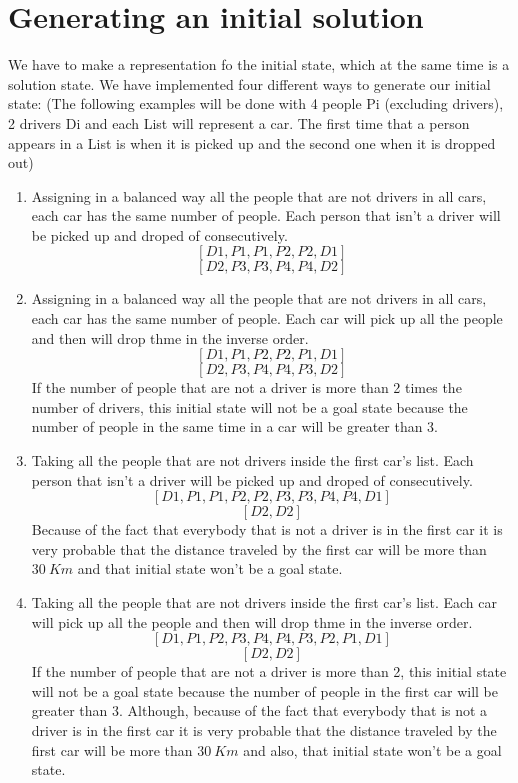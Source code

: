 \documentclass[12]{article}
\begin{document}
\section{Generating an initial solution}
We have to make a representation fo the initial state, which at the same time is a solution state. We have implemented four different ways to generate our initial state: (The following examples will be done with 4 people Pi (excluding drivers), 2 drivers Di and each List will represent a car. The first time that a person appears in a List is when it is picked up and the second one when it is dropped out)
\begin{enumerate}
\item Assigning in a balanced way all the people that are not drivers in all cars, each car has the same number of people. Each person that isn't a driver will be picked up and droped of consecutively.
$$[D1,P1,P1,P2,P2,D1]$$
$$[D2,P3,P3,P4,P4,D2]$$
\item Assigning in a balanced way all the people that are not drivers in all cars, each car has the same number of people. Each car will pick up all the people and then will drop thme in the inverse order.
$$[D1,P1,P2,P2,P1,D1]$$
$$[D2,P3,P4,P4,P3,D2]$$
If the number of people that are not a driver is more than 2 times the number of drivers, this initial state will not be a goal state because the number of people in the same time in a car will be greater than 3.
\item Taking all the people that are not drivers inside the first car's list. Each person that isn't a driver will be picked up and droped of consecutively.
$$[D1,P1,P1,P2,P2,P3,P3,P4,P4,D1]$$
$$[D2,D2]$$
Because of the fact that everybody that is not a driver is in the first car it is very probable that the distance traveled by the first car will be more than $30\ Km$ and that initial state won't be a goal state.
\item Taking all the people that are not drivers inside the first car's list. Each car will pick up all the people and then will drop thme in the inverse order.
$$[D1,P1,P2,P3,P4,P4,P3,P2,P1,D1]$$
$$[D2,D2]$$
If the number of people that are not a driver is more than 2, this initial state will not be a goal state because the number of people in the first car will be greater than 3. Although, because of the fact that everybody that is not a driver is in the first car it is very probable that the distance traveled by the first car will be more than $30\ Km$ and also, that initial state won't be a goal state.
\end{enumerate} 
\end{document}
